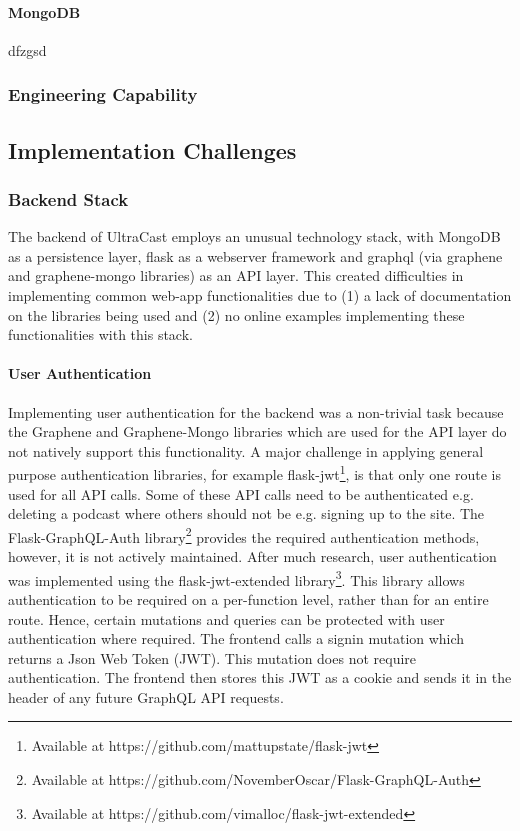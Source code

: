 \documentclass[../report.tex]{subfiles}
\begin{document}
\paragraph{MongoDB} dfzgsd



\subsubsection{Engineering Capability}

\iffalse
    \subsection{Implementation Challenges}

    \subsubsection{Backend Stack} \label{sssec:backend_challenges}

    The backend of UltraCast employs an unusual technology stack, with MongoDB as a persistence layer, flask as a webserver framework and graphql (via graphene and graphene-mongo libraries) as an API layer.
    This created difficulties in implementing common web-app functionalities due to (1) a lack of documentation on the libraries being used and (2) no online examples implementing these functionalities with this stack.

    \paragraph{User Authentication}

    Implementing user authentication for the backend was a non-trivial task because the Graphene and Graphene-Mongo libraries which are used for the API layer do not natively support this functionality.
    A major challenge in applying general purpose authentication libraries, for example flask-jwt\footnote{Available at https://github.com/mattupstate/flask-jwt}, is that only one route is used for all API calls.
    Some of these API calls need to be authenticated e.g. deleting a podcast where others should not be e.g. signing up to the site.
    The Flask-GraphQL-Auth library\footnote{Available at https://github.com/NovemberOscar/Flask-GraphQL-Auth} provides the required authentication methods, however, it is not actively maintained.
    After much research, user authentication was implemented using the flask-jwt-extended library\footnote{Available at https://github.com/vimalloc/flask-jwt-extended}.
    This library allows authentication to be required on a per-function level, rather than for an entire route.
    Hence, certain mutations and queries can be protected with user authentication where required.
    The frontend calls a signin mutation which returns a Json Web Token (JWT).
    This mutation does not require authentication.
    The frontend then stores this JWT as a cookie and sends it in the header of any future GraphQL API requests.
\end{document}
